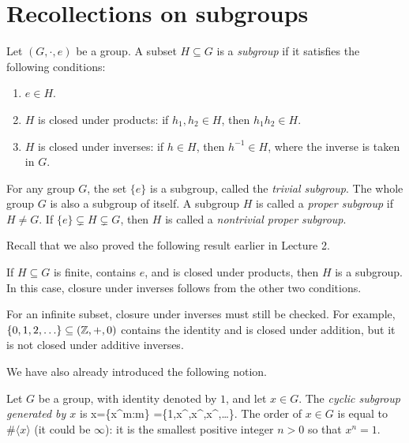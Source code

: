 \documentclass[reqno,11pt]{amsart}
\begin{document}
\makelecturetitle



 \section{Recollections on subgroups}

 \begin{define}[Subgroup]
		 Let $(G,\cdot,e)$ be a group. A subset $H\subseteq G$ is a \emph{subgroup}
		 if it satisfies the following conditions:
		 \begin{enumerate}[label=\textbf{(\arabic*)}]
				 \item $e\in H$.
				 \item $H$ is closed under products: if $h_1,h_2\in H$, then $h_1h_2\in H$.
				 \item $H$ is closed under inverses: if $h\in H$, then $h^{-1}\in H$,
				 where the inverse is taken in $G$.
				 \end{enumerate}
				 
				 
			For any group $G$, the set $\{e\}$ is a subgroup, called the
				 	\emph{trivial subgroup}. The whole group $G$ is also a subgroup of itself. A subgroup $H$ is called a \emph{proper subgroup} if $H\neq G$.
				 	If $\{e\}\subsetneq H\subsetneq G$, then $H$ is called a \emph{nontrivial proper
				 		subgroup}.
				 	
				
	 \end{define}

Recall that we also proved the following result earlier in Lecture 2.

 \begin{proposition}
		 If $H\subseteq G$ is finite, contains $e$, and is closed under products,
		 then $H$ is a subgroup. In this case, closure under inverses follows from
		 the other two conditions.
		 \end{proposition}


 \begin{remark}
		 For an infinite subset, closure under inverses must still be checked.
		 For example, $\{0,1,2,\ldots\}\subseteq(\mathbb{Z},+,0)$ contains the identity
		 and is closed under addition, but it is not closed under additive inverses.
		 \end{remark}


We have also already introduced the following notion.

 \begin{define}
		 Let $G$ be a group, with identity denoted by $1$, and let $x\in G$.
		 The \emph{cyclic subgroup generated by $x$} is
		 \be
		 \langle x\rangle=\{x^m:m\in\Z\}
		  =\{1,x^{},x^{},x^{},\ldots\}.
		 \ee The order of $x \in G$ is equal to $\# \langle x \rangle$ (it could be $\infty$): it is the smallest positive integer $n > 0$ so that $x^n=1$.
	 \end{define}
\end{document}
